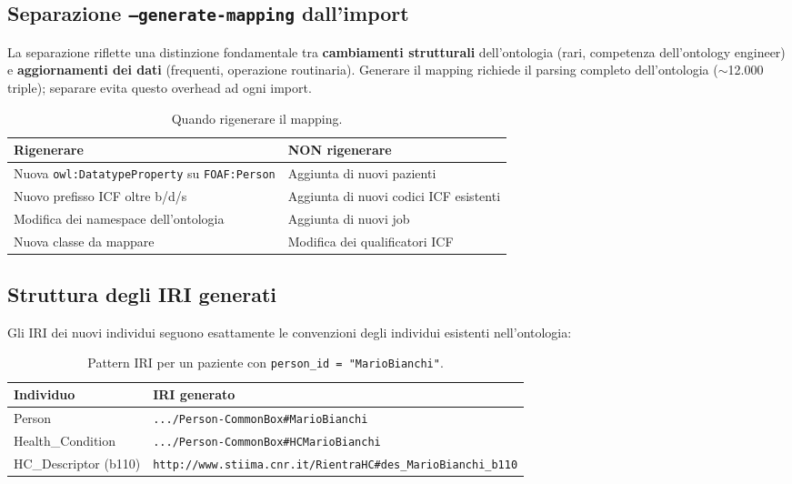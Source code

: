 \documentclass[a4paper,12pt]{article}
\begin{document}
\subsection{Separazione \texttt{--generate-mapping} dall'import}

\begin{infobox}
La separazione riflette una distinzione fondamentale tra
\textbf{cambiamenti strutturali} dell'ontologia (rari, competenza
dell'ontology engineer) e \textbf{aggiornamenti dei dati} (frequenti,
operazione routinaria). Generare il mapping richiede il parsing completo
dell'ontologia ($\sim$12.000 triple); separare evita questo overhead
ad ogni import.
\end{infobox}

\begin{table}[H]
\centering
\caption{Quando rigenerare il mapping.}
\begin{tabular}{L{6cm} L{6cm}}
\toprule
\textbf{Rigenerare} & \textbf{NON rigenerare} \\
\midrule
Nuova \texttt{owl:DatatypeProperty} su \texttt{FOAF:Person} &
  Aggiunta di nuovi pazienti \\
Nuovo prefisso ICF oltre b/d/s &
  Aggiunta di nuovi codici ICF esistenti \\
Modifica dei namespace dell'ontologia &
  Aggiunta di nuovi job \\
Nuova classe da mappare &
  Modifica dei qualificatori ICF \\
\bottomrule
\end{tabular}
\end{table}

\subsection{Struttura degli IRI generati}
\label{sec:iri}

Gli IRI dei nuovi individui seguono esattamente le convenzioni degli
individui esistenti nell'ontologia:

\begin{table}[H]
\centering
\caption{Pattern IRI per un paziente con \texttt{person\_id = "MarioBianchi"}.}
\begin{tabular}{L{4cm} L{8.5cm}}
\toprule
\textbf{Individuo} & \textbf{IRI generato} \\
\midrule
Person &
  {\footnotesize\texttt{.../Person-CommonBox\#MarioBianchi}} \\
Health\_Condition &
  {\footnotesize\texttt{.../Person-CommonBox\#HCMarioBianchi}} \\
HC\_Descriptor (b110) &
  \texttt{http://www.stiima.cnr.it/RientraHC\#des\_\allowbreak{}MarioBianchi\_\allowbreak{}b110} \\
\bottomrule
\end{tabular}
\end{table}
\end{document}
